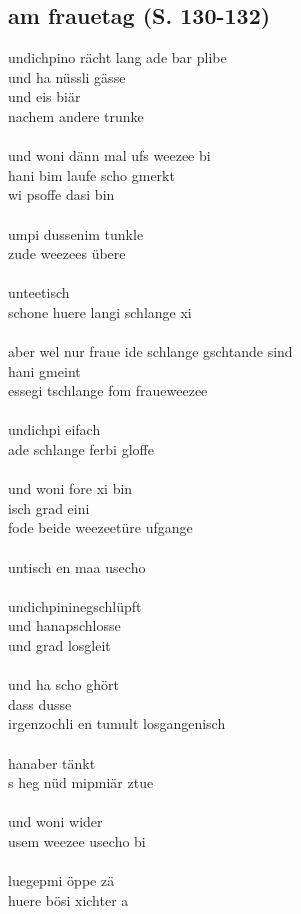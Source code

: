 \documentclass[a4paper,11pt]{scrartcl}
\begin{document}
\subsection*{am frauetag (S. 130-132)}
\begin{multicols}{2}
\noindent
undichpino rächt lang ade bar plibe\\
und ha nüssli gässe\\
und eis biär\\
nachem andere trunke\\
\\
und woni dänn mal ufs weezee bi\\
hani bim laufe scho gmerkt\\
wi psoffe dasi bin\\
\\
umpi dussenim tunkle\\
zude weezees übere\\
\\
unteetisch\\
schone huere langi schlange xi\\
\\
aber wel nur fraue ide schlange gschtande sind\\
hani gmeint\\
essegi tschlange fom fraueweezee\\
\\
undichpi eifach\\
ade schlange ferbi gloffe\\
\\
und woni fore xi bin\\
isch grad eini\\
fode beide weezeetüre ufgange\\
\\
untisch en maa usecho\\
\\
undichpininegschlüpft\\
und hanapschlosse\\
und grad losgleit\\
\\
und ha scho ghört\\
dass dusse\\
irgenzochli en tumult losgangenisch\\
\\
hanaber tänkt\\
s heg nüd mipmiär ztue\\
\\
und woni wider\\
usem weezee usecho bi\\
\\
luegepmi öppe zä\\
huere bösi xichter a
\end{multicols}
\end{document}

